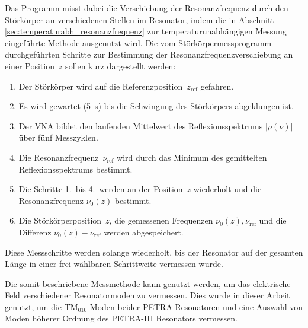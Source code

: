 Das Programm misst dabei die Verschiebung der Resonanzfrequenz durch den Störkörper an verschiedenen Stellen im Resonator, indem die in Abschnitt \ref{sec:temperaturabh_resonanzfrequenz} zur temperaturunabhängigen Messung eingeführte Methode ausgenutzt wird.
Die vom Störkörpermessprogramm durchgeführten Schritte zur Bestimmung der Resonanzfrequenzverschiebung an einer Position~$z$ sollen kurz dargestellt werden:
\begin{enumerate}
	\item Der Störkörper wird auf die Referenzposition~$z_\mathrm{ref}$ gefahren.
	\item Es wird gewartet (\SI{5}{s}) bis die Schwingung des Störkörpers abgeklungen ist.
	\item Der VNA bildet den laufenden Mittelwert des Reflexionsspektrums $|\rho(\nu)|$ über fünf Messzyklen.
	\item Die Resonanzfrequenz~$\nu_\mathrm{ref}$ wird durch das Minimum des gemittelten Reflexionsspektrums bestimmt.
	\item Die Schritte 1.\ bis 4.\ werden an der Position~$z$ wiederholt und die Resonanzfrequenz $\nu_0(z)$ bestimmt.
	\item Die Störkörperposition~$z$, die gemessenen Frequenzen $\nu_0(z), \nu_\mathrm{ref}$ und die Differenz $\nu_0(z) - \nu_\mathrm{ref}$ werden abgespeichert.
\end{enumerate}
Diese Messschritte werden solange wiederholt, bis der Resonator auf der gesamten Länge in einer frei wählbaren Schrittweite vermessen wurde.

Die somit beschriebene Messmethode kann genutzt werden, um das elektrische Feld verschiedener Resonatormoden zu vermessen.
Dies wurde in dieser Arbeit genutzt, um die $\mathrm{TM}_{010}$-Moden beider PETRA-Resonatoren und eine Auswahl von Moden höherer Ordnung des PETRA-III Resonators vermessen.